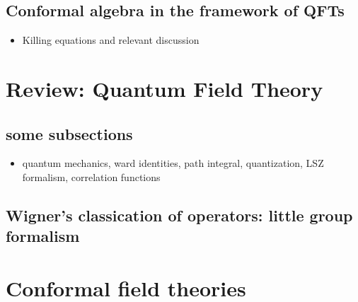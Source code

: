 \documentclass[12pt]{article}
\numberwithin{equation}{section}
\begin{document}
\subsection{Conformal algebra in the framework of QFTs}
\begin{itemize}
	\item Killing equations and relevant discussion
\end{itemize}

\section{Review: Quantum Field Theory}
\subsection{some subsections}
\begin{itemize}
	\item quantum mechanics, ward identities, path integral, quantization,
	LSZ formalism, correlation functions
\end{itemize}
\subsection{Wigner's classication of operators: little group formalism}

\section{Conformal field theories}


{}

\end{document}
